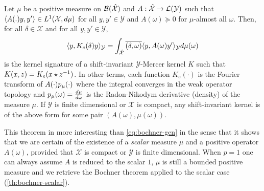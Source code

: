 \begin{proposition}\label{pr:mercer_kernel_bochner}
Let $\mu$ be a positive measure on $\mathcal{B}(\mathcal{\hat{\mathcal{X}}})$ and $A: \hat{\mathcal{X}}\to \mathcal{L}(\mathcal{Y})$ such that $\langle A(.)y,y'\rangle\in L^1(\mathcal{X},d\mu)$ for all $y,y'\in\mathcal{Y}$ and $A(\omega)\succcurlyeq 0$ for $\mu$-almost all $\omega$. Then, for all $\delta \in \mathcal{X}$ and for all $y, y' \in \mathcal{Y}$,
\begin{equation}
\label{eq:AK0}
\langle y,K_e(\delta)y\rangle_{\mathcal{Y}}=\int_{\hat{\mathcal{X}}}\overline{(\delta,\omega)}\langle y,A(\omega)y'\rangle_{\mathcal{Y}}d\mu(\omega)
\end{equation}
is the kernel signature of a shift-invariant $\mathcal{Y}$-Mercer kernel $K$ such that $K(x,z)=K_e(x \star {z}^{-1})$. In other terms, each function $K_e(\cdot)$ is the Fourier transform of $A(\cdot)p_{\mu}(\cdot)$ where the integral converges in the weak operator topology and $p_{\mu}(\omega)=\frac{d\mu}{d\omega}$ is the Radon-Nikodym derivative (density) of the measure $\mu$. If $\mathcal{Y}$ is finite dimensional or $\mathcal{X}$ is compact, any shift-invariant kernel is of the above form for some pair $(A(\omega),\mu (\omega))$. 
\end{proposition}
This theorem in more interesting than \cref{eq:bochner-gen} in the sense that it shows that we are certain of the existence of a \emph{scalar} measure $\mu$ and a positive operator $A(\omega)$, provided that $\mathcal{X}$ is compact or $\mathcal{Y}$ is finite dimensional. When $p=1$ one can always assume $A$ is reduced to the scalar $1$, $\mu$ is still a bounded positive measure and we retrieve the Bochner theorem applied to the scalar case (\cref{th:bochner-scalar}).
